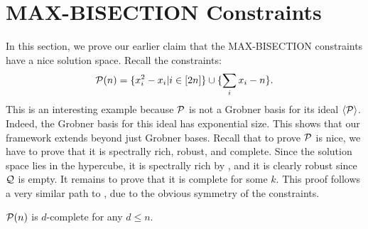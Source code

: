 \section{MAX-BISECTION Constraints}\label{sec:balance}
In this section, we prove our earlier claim that the MAX-BISECTION constraints have a nice solution space. Recall the constraints:
\[\mathcal P(n) = \{x_i^2 - x_i | i \in [2n]\} \cup \{\sum_i x_i - n\}.\]
This is an interesting example because $\mathcal P$ is not a Grobner basis for its ideal $\langle \mathcal P \rangle$. Indeed, the Grobner basis for this ideal has exponential size. This shows that our framework extends beyond just Grobner bases. Recall that to prove $\mathcal P$ is nice, we have to prove that it is spectrally rich, robust, and complete. Since the solution space lies in the hypercube, it is spectrally rich by , and it is clearly robust since $\mathcal Q$ is empty. It remains to prove that it is complete for some $k$. This proof follows a very similar path to \cite{}, due to the obvious symmetry of the constraints. 
\begin{lemma}
$\mathcal P(n)$ is $d$-complete for any $d \leq n$.
\end{lemma}
